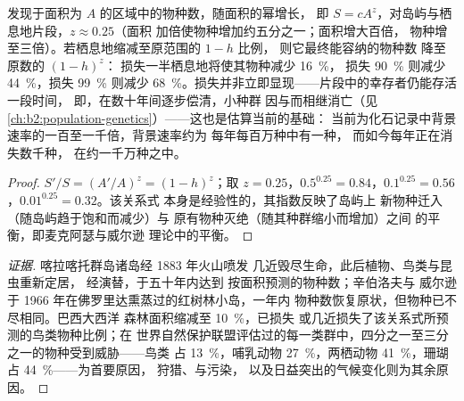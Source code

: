 \begin{theorem}[物种–面积关系与栖息地丧失的代价]\label{thm:b2:global-change:sar}
发现于面积为 $A$ 的区域中的物种数，随面积的幂增长，
即 $S = cA^{z}$，对岛屿与栖息地片段，$z \approx 0.25$（面积
加倍使物种增加约五分之一；面积增大百倍，
物种增至三倍）。若栖息地缩减至原范围的 $1 - h$ 比例，
则它最终能容纳的物种数
降至原数的 $(1 - h)^{z}$：
损失一半栖息地将使其物种减少 \qty{16}{\%}，
损失 \qty{90}{\%} 则减少 \qty{44}{\%}，损失 \qty{99}{\%} 则减少
\qty{68}{\%}。损失并非立即显现——片段中的幸存者仍能存活一段时间，
即\emph{}，在数十年间逐步偿清，小种群
因与而相继消亡（见
\cref{ch:b2:population-genetics}）——这也是估算当前的基础：
当前为化石记录中背景速率的一百至一千倍，背景速率约为
每年每百万种中有一种，
而如今每年正在消失数千种，
在约一千万种之中。
\end{theorem}
\begin{proof}
$S'/S = (A'/A)^{z} = (1 - h)^{z}$；取 $z = 0.25$，$0.5^{0.25} =
0.84$，$0.1^{0.25} = 0.56$，$0.01^{0.25} = 0.32$。该关系式
本身是经验性的，其指数反映了岛屿上
新物种迁入（随岛屿趋于饱和而减少）与
原有物种灭绝（随其种群缩小而增加）之间
的平衡，即麦克阿瑟与威尔逊
理论中的平衡。
\end{proof}
\begin{proof}[证据]
喀拉喀托群岛诸岛经 1883 年火山喷发
几近毁尽生命，此后植物、鸟类与昆虫重新定居，
经演替，于五十年内达到
按面积预测的物种数；辛伯洛夫与
威尔逊于 1966 年在佛罗里达熏蒸过的红树林小岛，一年内
物种数恢复原状，但物种已不尽相同。巴西大西洋
森林面积缩减至 \qty{10}{\%}，已损失
或几近损失了该关系式所预测的鸟类物种比例；在
世界自然保护联盟评估过的每一类群中，四分之一至三分之一的物种受到威胁——鸟类
占 \qty{13}{\%}，哺乳动物 \qty{27}{\%}，两栖动物 \qty{41}{\%}，珊瑚
占 \qty{44}{\%}——为首要原因，
狩猎、与污染，
以及日益突出的气候变化则为其余原因。
\end{proof}

